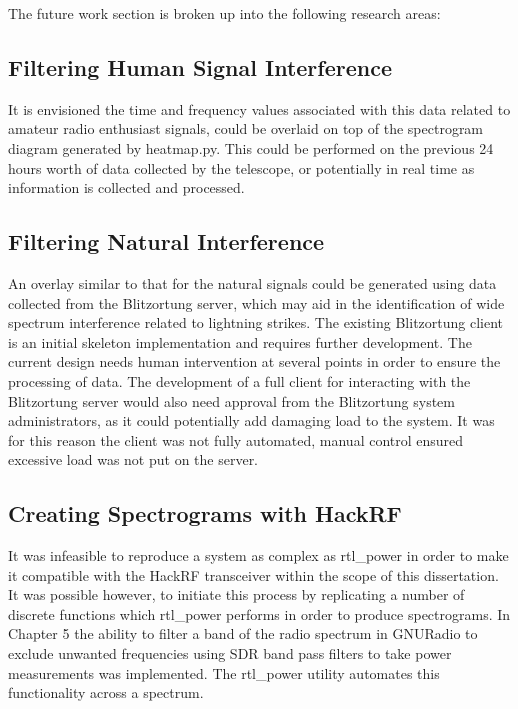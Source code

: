 The future work section is broken up into the following research areas:

\subsection*{Filtering Human Signal Interference}

It is envisioned the time and frequency values associated with this data related to amateur radio enthusiast signals, could be overlaid on top of the spectrogram diagram generated by heatmap.py. This could be performed on the previous 24 hours worth of data collected by the telescope, or potentially in real time as information is collected and processed.

\subsection*{Filtering Natural Interference}

An overlay similar to that for the natural signals could be generated using data collected from the Blitzortung server, which may aid in the identification of wide spectrum interference related to lightning strikes. The existing Blitzortung client is an initial skeleton implementation and requires further development. The current design needs human intervention at several points in order to ensure the processing of data. The development of a full client for interacting with the Blitzortung server would also need approval from the Blitzortung system administrators, as it could potentially add damaging load to the system. It was for this reason the client was not fully automated, manual control ensured excessive load was not put on the server.

\subsection*{Creating Spectrograms with HackRF}

It was infeasible to reproduce a system as complex as rtl\_power in order to make it compatible with the HackRF transceiver within the scope of this dissertation. It was possible however, to initiate this process by replicating a number of discrete functions which rtl\_power performs in order to produce spectrograms. In Chapter 5 the ability to filter a band of the radio spectrum in GNURadio to exclude unwanted frequencies using \gls{SDR} band pass filters to take power measurements was implemented. The rtl\_power utility automates this functionality across a spectrum. 

